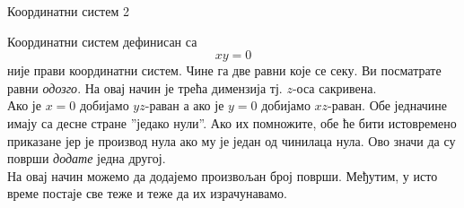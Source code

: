 \documentclass[sr]{./../../common/SurferDesc}%
\begin{document}
\footnotesize
%

\begin{surferPage}
  \begin{surferTitle}Координатни систем 2\end{surferTitle}
   \begin{surferText}
   
Координатни систем дефинисан са  
\[xy=0\]
није прави координатни систем. Чине га две равни које се секу. Ви посматрате равни {\it одозго}. На овај начин је трећа димензија тј. $z$-оса сакривена. \\
\vspace{0.3cm}
Ако је $x=0$ добијамо $yz$-раван а ако је $y=0$ добијамо $xz$-раван.
Обе једначине имају са десне стране ''једако нули''. Ако их помножите, обе ће бити истовремено приказане јер је производ нула ако му је један од чинилаца нула. Ово значи да су површи  {\it додате} једна другој. \\
На овај начин можемо да додајемо произвољан број површи. Међутим, у исто време постаје све теже и теже да их израчунавамо.
\end{surferText}
\end{surferPage}
\end{document}
